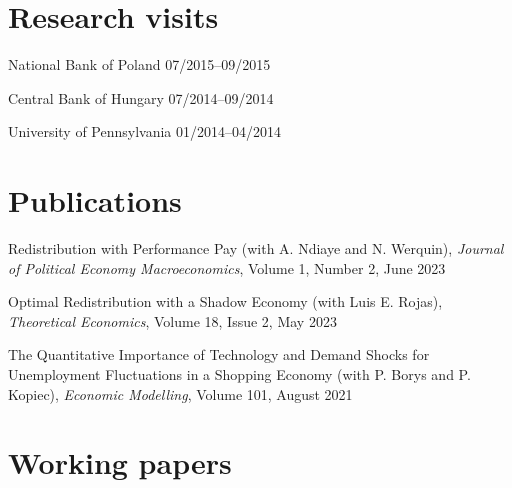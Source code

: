 \documentclass[letterpaper]{article}
\renewenvironment{itemize}{
  \begin{list}{}{
    \setlength{\leftmargin}{1.5em}
  }
}{
  \end{list}
}
\begin{document}
\section*{Research visits}

\begin{itemize}
  \item National Bank of Poland \hfill  07/2015--09/2015
  \item Central Bank of Hungary \hfill  07/2014--09/2014
  \item University of Pennsylvania \hfill  01/2014--04/2014
\end{itemize}


  



\section*{Publications}

\begin{itemize}
\item Redistribution with Performance Pay (with A. Ndiaye and N. Werquin), \textit{Journal of Political Economy Macroeconomics}, Volume 1, Number 2, June 2023
\item Optimal Redistribution with a Shadow Economy (with Luis E. Rojas), \textit{Theoretical Economics}, Volume 18, Issue 2, May 2023
\item The Quantitative Importance of Technology and Demand Shocks for Unemployment Fluctuations in a Shopping Economy (with P. Borys and P. Kopiec), \textit{Economic Modelling}, Volume 101, August 2021
\end{itemize}

\section*{Working papers}
\end{document}
